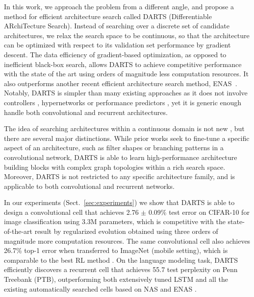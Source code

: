 \documentclass{article}
\begin{document}
In this work, we approach the problem from a different angle, and propose a method for efficient architecture search called DARTS (Differentiable ARchiTecture Search). Instead of searching over a discrete set of candidate architectures, we relax the search space to be continuous, so that the architecture can be optimized with respect to its validation set performance by gradient descent.
The data efficiency of gradient-based optimization, as opposed to inefficient black-box search,
allows DARTS to achieve competitive performance with the state of the art using orders of magnitude less computation resources. It also outperforms another recent efficient architecture search method, ENAS~\citep{pham2018efficient}.
Notably,
DARTS is simpler than many existing approaches as it does not involve 
controllers \citep{zoph2016neural, baker2016designing, zoph2017learning, pham2018efficient, zhong2018practical}, hypernetworks \citep{brock2017smash} or performance predictors \citep{liu2017progressive},
yet it is generic enough handle both convolutional and recurrent architectures.

The idea of searching architectures within a continuous domain is not new \citep{saxena2016convolutional, ahmed2017connectivity, veniat2017learning, shin2018differentiable},
but there are several major distinctions.
While prior works seek to fine-tune a specific aspect of an architecture,
such as filter shapes or branching patterns in a convolutional network,
DARTS is able to learn high-performance architecture building blocks with complex graph topologies within a rich search space.
Moreover,
DARTS is not restricted to any specific architecture family,
and is applicable to both convolutional and recurrent networks.

In our experiments (Sect.~\ref{sec:experiments})
we show that DARTS is able to design a convolutional cell that achieves 2.76 $\pm$ 0.09\% test error on CIFAR-10 for image classification using 3.3M parameters,
which is competitive with the state-of-the-art result by regularized evolution \citep{real2018regularized} obtained using three orders of magnitude more computation resources.
The same convolutional cell also achieves 26.7\% top-1 error when transferred to ImageNet (mobile setting),
which is comparable to the best RL method \citep{zoph2017learning}.
On the language modeling task,
DARTS efficiently discovers a recurrent cell that achieves 55.7 test perplexity on Penn Treebank (PTB),
outperforming both extensively tuned LSTM \citep{melis2017state}
and all the existing automatically searched cells based on NAS \citep{zoph2016neural} and ENAS \citep{pham2018efficient}.
\end{document}
